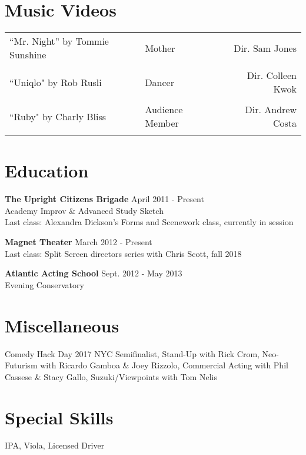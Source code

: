 \begin{resume}
\section{Music Videos}
\begin{tabular*}{\textwidth}{@{\extracolsep{\fill} } llr}
``Mr. Night''  by Tommie Sunshine&Mother&Dir. Sam Jones\\\\
``Uniqlo" by Rob Rusli &Dancer&Dir. Colleen Kwok\\\\
``Ruby" by Charly Bliss&Audience Member&Dir. Andrew Costa\\\\
\end{tabular*}

\section{Education}

{\bf The Upright Citizens Brigade} \hfill April 2011 -  Present\\
Academy Improv \& Advanced Study Sketch\\
Last class: Alexandra Dickson's Forms and Scenework class, currently in session

{\bf Magnet Theater} \hfill March 2012 -  Present\\
Last class: Split Screen directors series with Chris Scott, fall 2018

{\bf Atlantic Acting School} \hfill Sept. 2012 - May 2013 \\
Evening Conservatory

\section{Miscellaneous}

Comedy Hack Day 2017 NYC Semifinalist, Stand-Up with Rick Crom, Neo-Futurism with Ricardo Gamboa \& Joey Rizzolo, Commercial Acting with Phil Cassese \& Stacy Gallo, Suzuki/Viewpoints with Tom Nelis

\section{Special Skills}

IPA, Viola, Licensed Driver


\end{resume}
